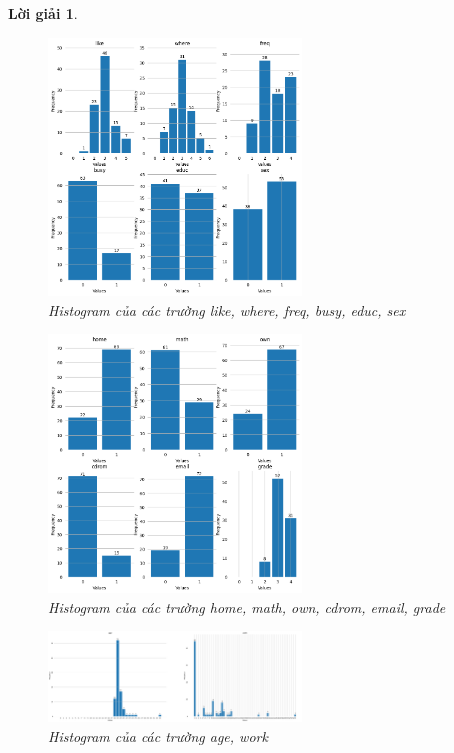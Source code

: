 \documentclass[14pt, a4paper]{article}
\theoremstyle{sltheorem}
\theoremstyle{soltheorem}
\newtheorem*{loigiai}{Lời giải}
\begin{document}
\begin{loigiai}
    \begin{figure}[h!]
        \centering
        \includegraphics[width=0.6\textwidth]{1.png}
        \caption{Histogram của các trường like, where, freq, busy, educ, sex}
        \label{fig:1}
    \end{figure}

    \begin{figure}[h!]
        \centering
        \includegraphics[width=0.6\textwidth]{2.png}
        \caption{Histogram của các trường home, math, own, cdrom, email, grade}
        \label{fig:2}
    \end{figure}

    \begin{figure}[h!]
        \centering
        \includegraphics[width=0.6\textwidth]{3.png}
        \caption{Histogram của các trường age, work}
        \label{fig:3}
    \end{figure}


\end{loigiai}
\end{document}
